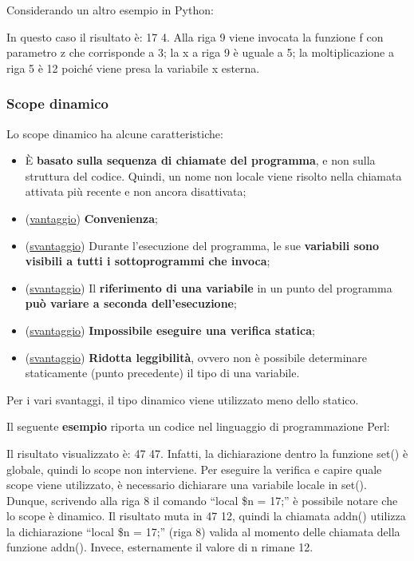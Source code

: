 \documentclass[a4paper]{article}
\newcommand{\dquotes}[1]{``#1''}
\begin{document}
 	\noindent
 	Considerando un altro esempio in Python:
 	
 	In questo caso il risultato è: 17 4. Alla riga 9 viene invocata la funzione \textsf{f} con parametro \textsf{z} che corrisponde a 3; la \textsf{x} a riga 9 è uguale a 5; la moltiplicazione a riga 5 è 12 poiché viene presa la variabile \textsf{x} esterna.\newpage
 	
 	\subsubsection{Scope dinamico}
 	
 	Lo scope dinamico ha alcune caratteristiche:
 	\begin{itemize}
 		\item È \textbf{basato sulla sequenza di chiamate del programma}, e non sulla struttura del codice. Quindi, un nome non locale viene risolto nella chiamata attivata più recente e non ancora disattivata;
 		
 		\item (\underline{vantaggio}) \textbf{Convenienza};
 		
 		\item (\underline{svantaggio}) Durante l'esecuzione del programma, le sue \textbf{variabili sono visibili a tutti i sottoprogrammi che invoca};
 		
 		\item (\underline{svantaggio}) Il \textbf{riferimento di una variabile} in un punto del programma \textbf{può variare a seconda dell'esecuzione};
 		
 		\item (\underline{svantaggio}) \textbf{Impossibile eseguire una verifica statica};
 		
 		\item (\underline{svantaggio}) \textbf{Ridotta leggibilità}, ovvero non è possibile determinare staticamente (punto precedente) il tipo di una variabile.
 	\end{itemize}
 	Per i vari svantaggi, il tipo dinamico viene utilizzato meno dello statico.\newline
 	
 	\noindent
 	Il seguente \textcolor{Green4}{\textbf{esempio}} riporta un codice nel linguaggio di programmazione Perl:
 	
 	Il risultato visualizzato è: 47 47. Infatti, la dichiarazione dentro la funzione \textsf{set()} è globale, quindi lo scope non interviene. Per eseguire la verifica e capire quale scope viene utilizzato, è necessario dichiarare una variabile locale in \textsf{set()}. Dunque, scrivendo alla riga 8 il comando \dquotes{\textsf{local \$n = 17;}} è possibile notare che lo scope è dinamico. Il risultato muta in 47 12, quindi la chiamata \textsf{addn()} utilizza la dichiarazione \dquotes{\textsf{local \$n = 17;}} (riga 8) valida al momento delle chiamata della funzione \textsf{addn()}. Invece, esternamente il valore di \textsf{n} rimane 12.\newpage
 	
\end{document}
